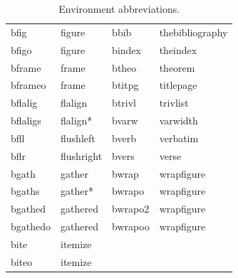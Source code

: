 \documentclass[letterpaper,11pt]{article}
\begin{document}
\begin{table}[H]
\begin{tabular}{llll}
bfig      & figure      & bbib    & thebibliography \\
bfigo     & figure      & bindex  & theindex \\
bframe    & frame       & btheo   & theorem \\
bframeo   & frame       & btitpg  & titlepage \\
bflalig   & flalign     & btrivl  & trivlist \\
bflaligs  & flalign*    & bvarw   & varwidth \\
bfll      & flushleft   & bverb   & verbatim \\
bflr      & flushright  & bvers   & verse \\
bgath     & gather      & bwrap   & wrapfigure \\
bgaths    & gather*     & bwrapo  & wrapfigure \\
bgathed   & gathered    & bwrapo2 & wrapfigure \\
bgathedo  & gathered    & bwrapoo & wrapfigure \\
bite      & itemize     &         & \\
biteo     & itemize     &         & \\
\end{tabular}
\caption{Environment abbreviations.}
\label{tbl:environments}
\end{table}
\end{document}
